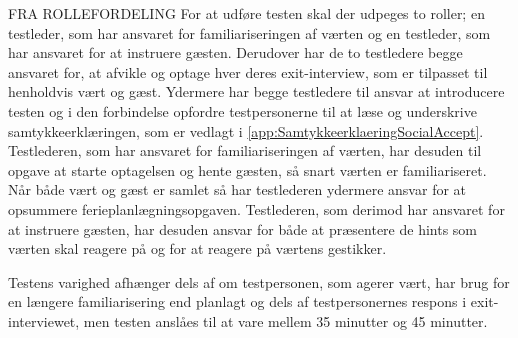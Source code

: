 FRA ROLLEFORDELING 
% 
For at udføre testen skal der udpeges to roller; en testleder, som har ansvaret for familiariseringen af værten og en testleder, som har ansvaret for at instruere gæsten. Derudover har de to testledere begge ansvaret for, at afvikle og optage hver deres exit-interview, som er tilpasset til henholdvis vært og gæst. Ydermere har begge testledere til ansvar at introducere testen og i den forbindelse opfordre testpersonerne til at læse og underskrive samtykkeerklæringen, som er vedlagt i \autoref{app:SamtykkeerklaeringSocialAccept}. Testlederen, som har ansvaret for familiariseringen af værten, har desuden til opgave at starte optagelsen og hente gæsten, så snart værten er familiariseret. Når både vært og gæst er samlet så har testlederen ydermere ansvar for at opsummere ferieplanlægningsopgaven. Testlederen, som derimod har ansvaret for at instruere gæsten, har desuden ansvar for både at præsentere de hints som værten skal reagere på og for at reagere på værtens gestikker.







Testens varighed afhænger dels af om testpersonen, som agerer vært, har brug for en længere familiarisering end planlagt og dels af testpersonernes respons i exit-interviewet, men testen anslåes til at vare mellem 35 minutter og 45 minutter. 
